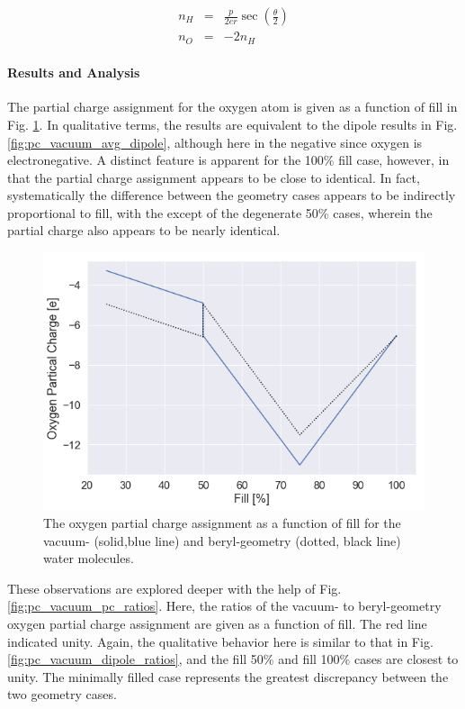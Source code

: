         \begin{eqnarray}
        \label{eq:pc_assign}
            n_H &=& \frac{p}{2er} \sec\left( \frac{\theta}{2} \right)  \\
            n_O &=& -2n_H 
        \end{eqnarray}
        
        \paragraph{Results and Analysis} The partial charge assignment for the oxygen atom is given as a function of fill in Fig. \ref{fig:pc_vacuum_pc}. In qualitative terms, the results are equivalent to the dipole results in Fig. \ref{fig:pc_vacuum_avg_dipole}, although here in the negative since oxygen is electronegative. A distinct feature is apparent for the 100\% fill case, however, in that the partial charge assignment appears to be close to identical. In fact, systematically the difference between the geometry cases appears to be indirectly proportional to fill, with the except of the degenerate 50\% cases, wherein the partial charge also appears to be nearly identical.
        
        \begin{figure}
            \centering
            \includegraphics[width=0.9\linewidth]{Figures/System/pc_vacuum_pc.png}
            \caption{The oxygen partial charge assignment as a function of fill for the vacuum- (solid,blue line) and beryl-geometry (dotted, black line) water molecules.}
            \label{fig:pc_vacuum_pc}
        \end{figure}
        
        These observations are explored deeper with the help of Fig. \ref{fig:pc_vacuum_pc_ratios}. Here, the ratios of the vacuum- to beryl-geometry oxygen partial charge assignment are given as a function of fill. The red line indicated unity. Again, the qualitative behavior here is similar to that in Fig. \ref{fig:pc_vacuum_dipole_ratios}, and the fill 50\% and fill 100\% cases are closest to unity. The minimally filled case represents the greatest discrepancy between the two geometry cases.
        

